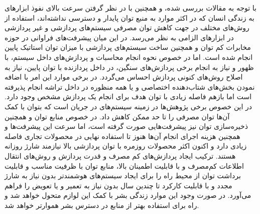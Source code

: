 
با توجه به مقالات بررسی شده، و همچنین با در نظر گرفتن سرعت بالای نفوذ ابزارهای  به زندگی انسان که در اکثر موارد به منبع توان پایدار و دسترسی نداشته‌اند، استفاده از روش‌های مختلف در جهت کاهش توان مصرفی سیستم‌های پردازشی و غیر پردازشی در ابزارهای  الزامی به نظر می‌رسد. در این میان پیشرفت‌های فراوانی در حوزه مخابرات کم‌ توان و همچنین ساخت سیستم‌های پردازشی با میزان توان استاتیک پایین انجام شده است. اما در خصوص نحوه انجام محاسبات و پردازش‌های داخل سیستم، با ظهور  و نیاز به انجام برخی پردازش‌های سنگین، در داخل پردازنده با توان پایین، نیاز به اصلاح روش‌های کنونی پردازش احساس می‌گردد. در برخی موارد این امر با اضافه نمودن بخش‌های شتاب‌دهنده اختصاصی و یا همه منظوره در داخل تراشه انجام پذیرفته است اما بازهم فاصله زیادی با توان هدف برای انجام یک پردازش مشخص وجود دارد. در این خصوص برخی پژوهش‌ها در زمینه سیستم‌های  در جریان است که بتوان با کمک آن‌ها توان مصرفی را تا حد ممکن کاهش داد. در خصوص منابع توان و همچنین ذخیره‌سازی توان نیز پیشرفت‌هایی صورت گرفته است، اما سرعت این پیشرفت‌ها و همچنین هزینه اجرای انجام آن‌ها هنوز تا استفاده نهایی در محصولات تجاری فاصله زیادی دارد و اکنون اکثر محصولات روزمره با توان پردازشی بالا نیازمند شارژ روزانه هستند. ترکیب ایجاد پردازش‌های کم‌ مصرف و قدرت پردازش و روش‌های انتقال اطلاعات کم‌مصرف و با قابلیت اطمینان بالا، منابع توان با ظرفیت مناسب و قابلیت برداشت توان از محیط راه را برای ایجاد سیستم‌های  هوشمندتر بدون نیاز به شارژ مجدد و با قابلیت کارکرد تا چندین سال بدون نیاز به تعمیر و یا تعویض را فراهم می‌آورد. در صورت وجود این موارد زندگی بشر با کمک این لوازم متحول خواهد شد و راه برای استفاده بهتر از منابع در دسترس بشر هموارتر خواهد شد.